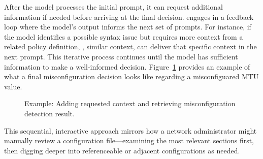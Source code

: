  After the model processes the initial prompt, it can request additional information if needed before arriving at the final decision. \sysname{} engages in a feedback loop where the model’s output informs the next set of prompts. For instance, if the model identifies a possible syntax issue but requires more context from a related policy definition, \ie, similar context, \sysname{} can deliver that specific context in the next prompt. This iterative process continues until the model has sufficient information to make a well-informed decision. Figure~\ref{fig:feedback_and_response} provides an example of what a final misconfiguration decision looks like regarding a misconfiguared MTU value.
    \begin{figure}[tb]
    \centering
    \caption{Example: Adding requested context and retrieving misconfiguration detection result.}
    \label{fig:feedback_and_response}
\end{figure}


This sequential, interactive approach mirrors how a network administrator might manually review a configuration file—examining the most relevant sections first, then digging deeper into referenceable or adjacent configurations as needed.


